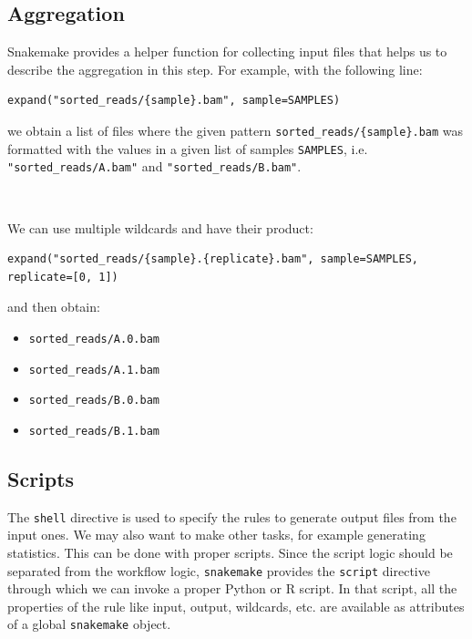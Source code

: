 \documentclass[10pt]{article}
\begin{document}
\subsection{Aggregation}

Snakemake provides a helper function for collecting input files that helps us to describe the aggregation in this step. For example, with the following line:

\begin{lstlisting}[style=mypython]
expand("sorted_reads/{sample}.bam", sample=SAMPLES)
\end{lstlisting}

we obtain a list of files where the given pattern \texttt{sorted\_reads/\{sample\}.bam} was formatted with the values in a given list of samples \texttt{SAMPLES}, i.e. \texttt{"sorted\_reads/A.bam"} and \texttt{"sorted\_reads/B.bam"}.

\

We can use multiple wildcards and have their product:

\begin{lstlisting}[style=mypython]
expand("sorted_reads/{sample}.{replicate}.bam", sample=SAMPLES, replicate=[0, 1])
\end{lstlisting}

and then obtain:
\begin{itemize}
    \item \texttt{sorted\_reads/A.0.bam} 
    \item \texttt{sorted\_reads/A.1.bam} 
    \item \texttt{sorted\_reads/B.0.bam} 
    \item \texttt{sorted\_reads/B.1.bam}
\end{itemize}

\subsection{Scripts}

The \texttt{shell} directive is used to specify the rules to generate output files from the input ones. We may also want to make other tasks, for example generating statistics. This can be done with proper scripts. Since the script logic should be separated from the workflow logic, \texttt{snakemake} provides the \texttt{script} directive through which we can invoke a proper Python or R script. In that script, all the properties of the rule like input, output, wildcards, etc. are available as attributes of a global \texttt{snakemake} object.
\end{document}
